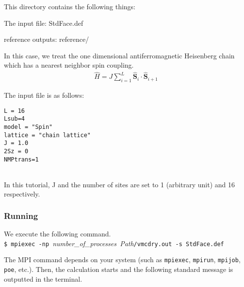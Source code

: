 This directory contains the following things:

The input file: StdFace.def

reference outputs: reference/

In this case, we treat the one dimensional antiferromagnetic Heisenberg chain
which has a nearest neighbor spin coupling.
\begin{align}
  {\hat H} = J \sum_{i=1}^{L} {\hat {\boldsymbol S}}_i \cdot {\hat {\boldsymbol S}}_{i+1}
\end{align}

The input file is as follows:
\\
\begin{minipage}{10cm}
\begin{screen}
\begin{verbatim}
L = 16
Lsub=4
model = "Spin"
lattice = "chain lattice"
J = 1.0
2Sz = 0
NMPtrans=1
\end{verbatim}
\end{screen}
\end{minipage}
%
\\
In this tutorial, J and the number of sites are set to 1 (arbitrary unit) and 16 respectively.

\subsubsection{Running}

We execute the following command. \\
\verb|$ mpiexec -np |\textit{number\_of\_processes}\verb| |\textit{Path}\verb|/vmcdry.out -s StdFace.def|

The MPI command depends on your system (such as \verb|mpiexec|, \verb|mpirun|, \verb|mpijob|,
\verb|poe|, etc.).
Then, the calculation starts and the following standard message is outputted in the terminal.

